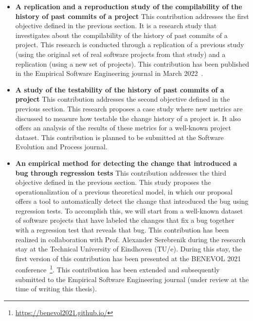 \begin{itemize}
    \item \textbf{A replication and a reproduction study of the compilability of the history of past commits of a project}
    This contribution addresses the first objective defined in the previous section.
    It is a research study that investigates about the compilability of the history of past commits of a project.
    This research is conducted through a replication of a previous study~\cite{tufano2017there} (using the original set of real software projects from that study) and a replication (using a new set of projects).
    This contribution has been published in the Empirical Software Engineering journal in March 2022~\cite{maes2022revisiting}.
    \item \textbf{A study of the testability of the history of past commits of a project}
    This contribution addresses the second objective defined in the previous section.
    This research proposes a case study where new metrics are discussed to measure how testable the change history of a project is. It also offers an analysis of the results of these metrics for a well-known project dataset.
    This contribution is planned to be submitted at the Software Evolution and Process journal.
    \item \textbf{An empirical method for detecting the change that introduced a bug through regression tests}
    This contribution addresses the third objective defined in the previous section. 
    This study proposes the operationalization of a previous theoretical model, in which our proposal offers a tool to automatically detect the change that introduced the bug using regression tests. 
    To accomplish this, we will start from a well-known dataset of software projects that have labeled the changes that fix a bug together with a regression test that reveals that bug.
    This contribution has been realized in collaboration with Prof. Alexander Serebrenik during the research stay at the Technical University of Eindhoven (TU/e). 
    During this stay, the first version of this contribution has been presented at the BENEVOL 2021 conference~\footnote{\url{https://benevol2021.github.io/}}. 
    This contribution has been extended and subsequently submitted to the Empirical Software Engineering journal (under review at the time of writing this thesis).
\end{itemize}

